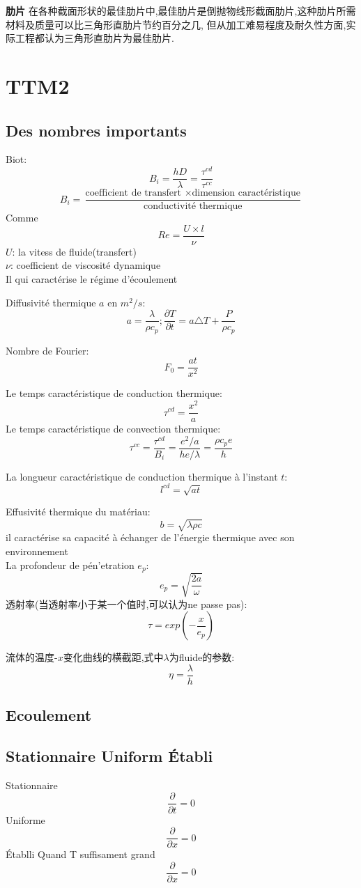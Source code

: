 \documentclass{article}
\begin{document}
\textbf{肋片}
在各种截面形状的最佳肋片中,最佳肋片是倒抛物线形截面肋片,这种肋片所需材料及质量可以比三角形直肋片节约百分之几,
但从加工难易程度及耐久性方面,实际工程都认为三角形直肋片为最佳肋片.

\section{TTM2}
\subsection{Des nombres importants}
Biot:$$B_i = \frac{ hD}{\lambda }=\frac{\tau^{cd}}{\tau^{cc}}$$
$$B_i = \frac{ \text{coefficient de transfert } \times \text{dimension caract\'eristique} }{\text{conductivit\'e thermique}}$$
Comme $$Re=\frac{U\times l}{\nu}$$
$U$: la vitess de fluide(transfert)\\
$\nu$: coefficient de viscosit\'e dynamique\\
Il qui caract\'erise le r\'egime d'\'ecoulement

Diffusivit\'e thermique $a$ en $m^2/s$:$$a=\frac{\lambda }{\rho c_p};\frac{\partial T}{\partial t}=a\triangle T + \frac{P}{\rho c_p}$$

Nombre de Fourier:$$F_0=\frac{ at}{x^2}$$

Le temps caract\'eristique de conduction thermique:$$\tau^{cd}=\frac{x^2}{a}$$
Le temps caract\'eristique de convection thermique:$$\tau^{cc}=\frac{\tau^{cd}}{B_i}=\frac{e^2/a }{he/\lambda }=\frac{\rho c_p e}{h}$$

La longueur caract\'eristique de conduction thermique \`a l'instant $t$:$$l^{cd}=\sqrt{at}$$

Effusivit\'e thermique du mat\'eriau:$$b=\sqrt{\lambda \rho c}$$
il caract\'erise sa capacit\'e \`a \'echanger de l'\'energie thermique avec son environnement\\

La profondeur de p\'en'etration $e_p$:$$e_p=\sqrt{\frac{2a}{\omega}}$$
透射率(当透射率小于某一个值时,可以认为ne passe pas):$$\tau = exp(-\frac{x}{e_p})$$


流体的温度-$x$变化曲线的横截距,式中$\lambda$为fluide的参数:$$\eta=\frac{\lambda }{h}$$

\subsection{Ecoulement}
\subsection{Stationnaire Uniform \'Etabli}
Stationnaire
$$ \frac{\partial  }{\partial t}=0 $$
Uniforme
$$ \frac{\partial  }{\partial x}=0 $$
\'Etablli
Quand T suffisament grand
$$ \frac{\partial  }{\partial x}=0 $$
\end{document}
